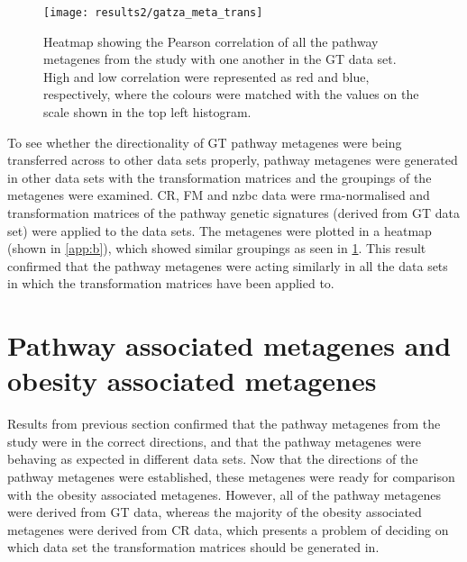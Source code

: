 \begin{figure}[htpb]
	\centering
	\texttt{[image: results2/gatza\_meta\_trans]}
	\caption[Heatmap of the Pearson correlation of all the pathway metagenes with one another in the \acrshort{rma}-normalised GT data]{Heatmap showing the Pearson correlation of all the pathway metagenes from the \citet{Gatza2010a} study with one another  in the GT data set.
		High and low correlation were represented as red and blue, respectively, where the colours were matched with the values on the scale shown in the top left histogram.}
	\label{fig:gatza_meta_dir}
\end{figure}

To see whether the directionality of GT pathway metagenes were being transferred across to other data sets properly, pathway metagenes were generated in other data sets with the transformation matrices and the groupings of the metagenes were examined.
CR, FM and \gls{nzbc} data were \gls{rma}-normalised and transformation matrices of the pathway genetic signatures (derived from GT data set) were applied to the data sets.
The metagenes were plotted in a heatmap (shown in \cref{app:b}), which showed similar groupings  as seen in \cref{fig:gatza_meta_dir}.
This result confirmed that the pathway metagenes were acting similarly in all the data sets in which the transformation matrices have been applied to.


\section{Pathway associated metagenes and obesity associated metagenes}
\label{sec:pathway_associated_metagenes_and_obesity_associated_metagenes}

Results from previous section confirmed that the pathway metagenes from the \citet{Gatza2010a} study were in the correct directions, and that the pathway metagenes were behaving as expected in different data sets.
Now that the directions of the pathway metagenes were established, these metagenes were ready for comparison with the obesity associated metagenes.
However, all of the pathway metagenes were derived from GT data, whereas the majority of the obesity associated metagenes were derived from CR data, which presents a problem of deciding on which data set the transformation matrices should be generated in.

